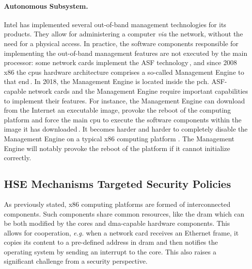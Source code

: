 \paragraph{Autonomous Subsystem.}
%
Intel has implemented several out-of-band management technologies for its
products.
%
They allow for administering a computer \emph{via} the network, without the need
for a physical access.
%
In practice, the software components responsible for implementing the
out-of-band management features are not executed by the main processor: some
network cards implement the ASF technology\,\cite{duflot2010network}, and since
2008 x86 the \acp{cpu} hardware architecture comprises a so-called Management
Engine to that end\,\cite{ruan2014me,skochinsky2014intel}.
%
In 2018, the Management Engine is located inside the \ac{pch}.
%
ASF-capable network cards and the Management Engine require important
capabilities to implement their features.
%
For instance, the Management Engine can download from the Internet an executable
image, provoke the reboot of the computing platform and force the main \ac{cpu}
to execute the software components within the image it has
downloaded\,\cite{kumar2009active}.
%
It becomes harder and harder to completely disable the Management Engine on a
typical x86 computing platform .
%
The Management Engine will notably provoke the reboot of the platform if it
cannot initialize correctly.

\subsection{HSE Mechanisms Targeted Security Policies}
\label{subsec:usecase:targetedsec}

As previously stated, x86 computing platforms are formed of interconnected
components.
%
Such components share common resources, like the \ac{dram} which can be both
modified by the cores and \ac{dma}-capable hardware components.
%
This allows for cooperation, \emph{e.g.} when a network card receives an
Ethernet frame, it copies its content to a pre-defined address in \ac{dram} and then
notifies the operating system by sending an interrupt to the core.
%
This also raises a significant challenge from a security perspective.

